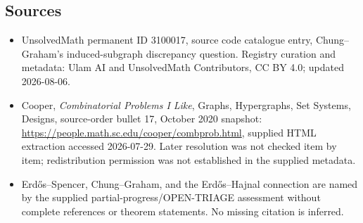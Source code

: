 \documentclass[11pt]{article}
\begin{document}
\subsection{Sources}
\begin{itemize}
\item UnsolvedMath permanent ID 3100017, source code catalogue entry, Chung--Graham's induced-subgraph discrepancy question. Registry curation and metadata: Ulam AI and UnsolvedMath Contributors, CC BY 4.0; updated 2026-08-06.
\item Cooper, \emph{Combinatorial Problems I Like}, Graphs, Hypergraphs, Set Systems, Designs, source-order bullet 17, October 2020 snapshot: \url{https://people.math.sc.edu/cooper/combprob.html}, supplied HTML extraction accessed 2026-07-29. Later resolution was not checked item by item; redistribution permission was not established in the supplied metadata.
\item Erdős--Spencer, Chung--Graham, and the Erdős--Hajnal connection are named by the supplied partial-progress/OPEN-TRIAGE assessment without complete references or theorem statements. No missing citation is inferred.
\end{itemize}
\end{document}
